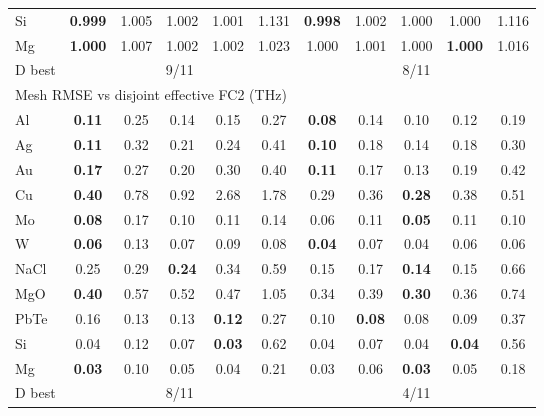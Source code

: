 \begin{table}[t]
\begin{ruledtabular}
\begin{tabular}{lcccccccccc}
Si & \textbf{0.999} & 1.005 & 1.002 & 1.001 & 1.131 & \textbf{0.998} & 1.002 & 1.000 & 1.000 & 1.116\\
Mg & \textbf{1.000} & 1.007 & 1.002 & 1.002 & 1.023 & 1.000 & 1.001 & 1.000 & \textbf{1.000} & 1.016\\
D best & \multicolumn{5}{c}{9/11} & \multicolumn{5}{c}{8/11}\\
\hline
\multicolumn{11}{l}{Mesh RMSE vs disjoint effective FC2 (THz)}\\
Al & \textbf{0.11} & 0.25 & 0.14 & 0.15 & 0.27 & \textbf{0.08} & 0.14 & 0.10 & 0.12 & 0.19\\
Ag & \textbf{0.11} & 0.32 & 0.21 & 0.24 & 0.41 & \textbf{0.10} & 0.18 & 0.14 & 0.18 & 0.30\\
Au & \textbf{0.17} & 0.27 & 0.20 & 0.30 & 0.40 & \textbf{0.11} & 0.17 & 0.13 & 0.19 & 0.42\\
Cu & \textbf{0.40} & 0.78 & 0.92 & 2.68 & 1.78 & 0.29 & 0.36 & \textbf{0.28} & 0.38 & 0.51\\
Mo & \textbf{0.08} & 0.17 & 0.10 & 0.11 & 0.14 & 0.06 & 0.11 & \textbf{0.05} & 0.11 & 0.10\\
W & \textbf{0.06} & 0.13 & 0.07 & 0.09 & 0.08 & \textbf{0.04} & 0.07 & 0.04 & 0.06 & 0.06\\
NaCl & 0.25 & 0.29 & \textbf{0.24} & 0.34 & 0.59 & 0.15 & 0.17 & \textbf{0.14} & 0.15 & 0.66\\
MgO & \textbf{0.40} & 0.57 & 0.52 & 0.47 & 1.05 & 0.34 & 0.39 & \textbf{0.30} & 0.36 & 0.74\\
PbTe & 0.16 & 0.13 & 0.13 & \textbf{0.12} & 0.27 & 0.10 & \textbf{0.08} & 0.08 & 0.09 & 0.37\\
Si & 0.04 & 0.12 & 0.07 & \textbf{0.03} & 0.62 & 0.04 & 0.07 & 0.04 & \textbf{0.04} & 0.56\\
Mg & \textbf{0.03} & 0.10 & 0.05 & 0.04 & 0.21 & 0.03 & 0.06 & \textbf{0.03} & 0.05 & 0.18\\
D best & \multicolumn{5}{c}{8/11} & \multicolumn{5}{c}{4/11}\\
\end{tabular}
\end{ruledtabular}
\end{table}
